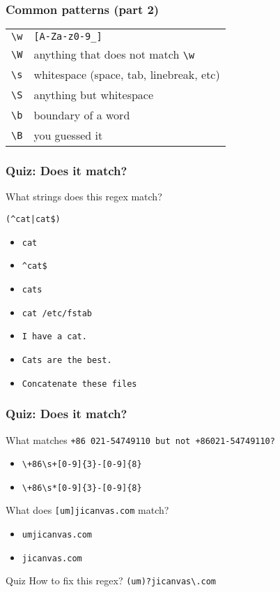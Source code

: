 \begin{frame}[fragile]
\frametitle{Common patterns (part 2)}
\begin{table}
    \centering
    \begin{tabular}{ll}
        \verb|\w|           & \verb|[A-Za-z0-9_]| \\
        \verb|\W|           & anything that does not match \verb|\w| \\
        \verb|\s|           & whitespace (space, tab, linebreak, etc) \\
        \verb|\S|           & anything but whitespace \\
        \verb|\b|           & boundary of a word \\
        \verb|\B|           & you guessed it
    \end{tabular}
\end{table}
\end{frame}

\begin{frame}[fragile]
\frametitle{Quiz: Does it match?}
What strings does this regex match? \newline

\Large \verb!(^cat|cat$)! \normalsize

\begin{itemize}
    \item \verb|cat|                      %
    \item \verb|^cat$|                    %
    \item \verb|cats|                     %
    \item \verb|cat /etc/fstab|           %
    \item \verb|I have a cat.|            %
    \item \verb|Cats are the best.|       %
    \item \verb|Concatenate these files|  %
\end{itemize}
\end{frame}

\begin{frame}[fragile]
\frametitle{Quiz: Does it match?}
What matches \tt{+86 021-54749110} but not \tt{+86021-54749110}?
\begin{itemize}
    \item \verb|\+86\s+[0-9]{3}-[0-9]{8}|
    \item \verb|\+86\s*[0-9]{3}-[0-9]{8}| %
\end{itemize}

What does \Large \verb|[um]jicanvas.com| \normalsize match?
\begin{itemize}
    \item \tt{umjicanvas.com}
    \item \tt{jicanvas.com} %
\end{itemize}

\begin{block}{Quiz}
    How to fix this regex? \pause \verb|(um)?jicanvas\.com|
\end{block}
\end{frame}

